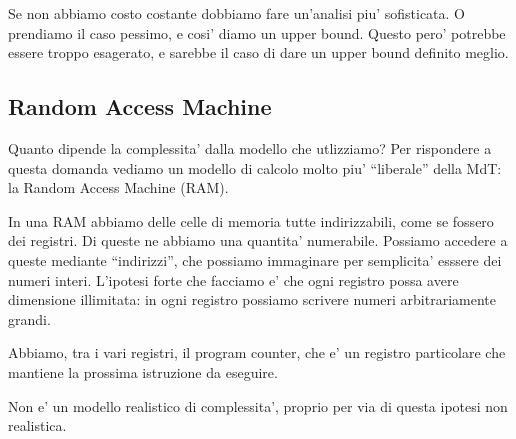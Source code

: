 Se non abbiamo costo costante dobbiamo fare un'analisi piu' sofisticata. O prendiamo il caso
pessimo, e cosi' diamo un upper bound. Questo pero' potrebbe essere troppo esagerato, e sarebbe il
caso di dare un upper bound definito meglio.

\subsection{Random Access Machine}

Quanto dipende la complessita' dalla modello che utlizziamo? Per rispondere a questa domanda vediamo
un modello di calcolo molto piu' ``liberale'' della MdT: la Random Access Machine (RAM).

In una RAM abbiamo delle celle di memoria tutte indirizzabili, come se fossero dei registri. Di
queste ne abbiamo una quantita' numerabile. Possiamo accedere a queste mediante ``indirizzi'', che
possiamo immaginare per semplicita' esssere dei numeri interi. L'ipotesi forte che facciamo e' che
ogni registro possa avere dimensione illimitata: in ogni registro possiamo scrivere numeri
arbitrariamente grandi.

Abbiamo, tra i vari registri, il program counter, che e' un registro particolare che mantiene la
prossima istruzione da eseguire.

Non e' un modello realistico di complessita', proprio per via di questa ipotesi non realistica.

